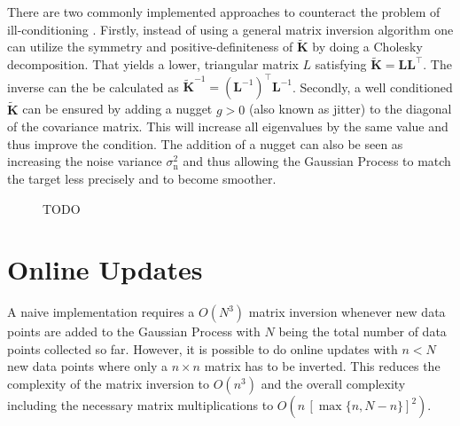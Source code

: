 \documentclass[11pt,a4paper,twoside,BCOR=15mm]{scrreprt}
\newcommand{\mat}[1]{\bm{#1}}
\newcommand{\Tr}{^{\top}}
\newcommand{\ped}[1]{_{\mathrm{#1}}}
\begin{document}
There are two commonly implemented approaches to counteract the problem of 
ill-conditioning \parencite[cp.]{Sacks:1989cv, Neal:1997tj, Booker:1999wz, 
    Gramacy:2008es}. Firstly, instead of using a general matrix inversion 
algorithm one can utilize the symmetry and positive-definiteness of 
$\tilde{\mat{K}}$ by doing a Cholesky decomposition. That yields a lower, 
triangular matrix $L$ satisfying $\tilde{\mat K} = \mat L\mat L\Tr$. The inverse 
can the be calculated as $\tilde{\mat K}^{-1} = (\mat L^{-1})\Tr \mat L^{-1}$.  
Secondly, a well conditioned $\tilde{\mat K}$ can be ensured by adding a nugget 
$g > 0$ (also known as jitter) to the diagonal of the covariance matrix. This 
will increase all eigenvalues by the same value and thus improve the condition.  
The addition of a nugget can also be seen as increasing the noise variance 
$\sigma\ped{n}^2$ and thus allowing the Gaussian Process to match the target 
less precisely and to become smoother.

\begin{figure}
    \centering
    \caption[TODO]{TODO}
\end{figure}

\section{Online Updates}
A naive implementation requires a $O(N^3)$ matrix inversion whenever new data 
points are added to the Gaussian Process with $N$ being the total number of data 
points collected so far. However, it is possible to do online updates with $n 
< N$ new data points where only a $n \times n$ matrix has to be inverted. This 
reduces the complexity of the matrix inversion to $O(n^3)$ and the overall 
complexity including the necessary matrix multiplications to $O(n\,{[\max\{n, 
    N - n\}]}^2)$.
\end{document}

